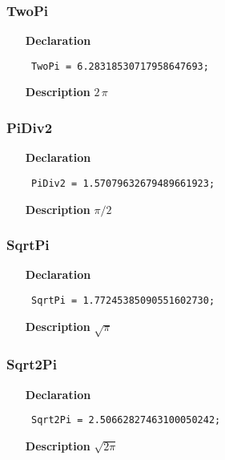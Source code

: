 \documentclass[12pt,a4paper,oneside]{report}
\newcommand{\declarationitem}[1]{\textbf{#1}}
\newcommand{\descriptiontitle}[1]{\textbf{#1}}
\newcommand{\code}[1]{\texttt{#1}}
\begin{document}
\subsubsection{TwoPi}
\label{utypes-TwoPi}
\begin{itemize}\item[\declarationitem{Declaration}\hfill]
	\begin{flushleft}
		\code{
			TwoPi      = 6.28318530717958647693;}
		
	\end{flushleft}
	
	\par
	\item[\descriptiontitle{Description}]
	$2\,\pi$
	
\end{itemize}
\subsubsection{PiDiv2}
\label{utypes-PiDiv2}
\begin{itemize}\item[\declarationitem{Declaration}\hfill]
	\begin{flushleft}
		\code{
			PiDiv2     = 1.57079632679489661923;}
		
	\end{flushleft}
	
	\par
	\item[\descriptiontitle{Description}]
	$\pi/2$
	
\end{itemize}
\subsubsection{SqrtPi}
\label{utypes-SqrtPi}
\begin{itemize}\item[\declarationitem{Declaration}\hfill]
	\begin{flushleft}
		\code{
			SqrtPi     = 1.77245385090551602730;}
		
	\end{flushleft}
	
	\par
	\item[\descriptiontitle{Description}]
	$\sqrt{\pi}$
	
\end{itemize}
\subsubsection{Sqrt2Pi}
\label{utypes-Sqrt2Pi}
\begin{itemize}\item[\declarationitem{Declaration}\hfill]
	\begin{flushleft}
		\code{
			Sqrt2Pi    = 2.50662827463100050242;}
		
	\end{flushleft}
	
	\par
	\item[\descriptiontitle{Description}]
$\sqrt{2\pi}$
	
\end{itemize}
\end{document}
